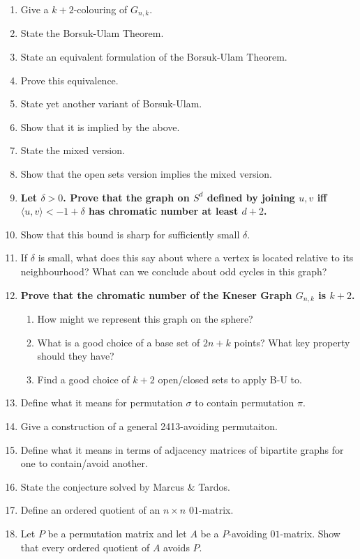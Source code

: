 \documentclass[10pt]{article}
\begin{document}
\begin{enumerate}
    \item Give a $k+2$-colouring of $G_{n,k}$.
    \item State the Borsuk-Ulam Theorem.
    \item State an equivalent formulation of the Borsuk-Ulam Theorem.
    \item Prove this equivalence.
    \item State yet another variant of Borsuk-Ulam.
    \item Show that it is implied by the above.
    \item State the mixed version.
    \item Show that the open sets version implies the mixed version.
    \item \textbf{Let $\delta > 0$. Prove that the graph on $S^d$ defined by joining $u,v$ iff $\langle u,v\rangle < -1 + \delta$ has chromatic number at least $d + 2$.}
    \item Show that this bound is sharp for sufficiently small $\delta$.
    \item If $\delta$ is small, what does this say about where a vertex is located relative to its neighbourhood? What can we conclude about odd cycles in this graph?
    \item \textbf{Prove that the chromatic number of the Kneser Graph $G_{n,k}$ is $k + 2$.}
    \begin{enumerate}
        \item How might we represent this graph on the sphere?
        \item What is a good choice of a base set of $2n+k$ points? What key property should they have?
        \item Find a good choice of $k + 2$ open/closed sets to apply B-U to.
    \end{enumerate}
    \item Define what it means for permutation $\sigma$ to contain permutation $\pi$.
    \item Give a construction of a general 2413-avoiding permutaiton.
    \item Define what it means in terms of adjacency matrices of bipartite graphs for one to contain/avoid another.
    \item State the conjecture solved by Marcus \& Tardos.
    \item Define an ordered quotient of an $n\times n$ $01$-matrix.
    \item Let $P$ be a permutation matrix and let $A$ be a $P$-avoiding $01$-matrix. Show that every ordered quotient of $A$ avoids $P$.

\end{enumerate}
\end{document}
